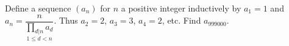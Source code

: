Define a sequence $(a_n)$ for $n$ a positive integer inductively by $a_1 = 1$
and $a_n = \dfrac{n}{\underset{1 \le d < n}{\prod_{d|n} a_d}}$. Thus $a_2 = 2$,
$a_3 = 3$, $a_4 = 2$, etc. Find $a_{999000}$.
